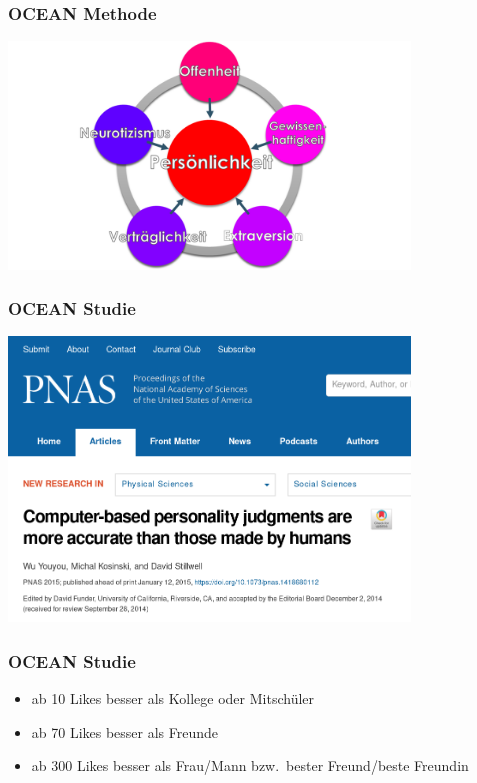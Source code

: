 \begin{frame}
	\frametitle{OCEAN Methode}
	\begin{center}
		\includegraphics[width=0.8\textwidth]{img/ocean-modell.png}
	\end{center}
\end{frame}

\begin{frame}
	\frametitle{OCEAN Studie}
	\begin{center}
		\includegraphics[width=0.8\textwidth]{img/ocean-facebook-studie.png}
	\end{center}
\end{frame}

\begin{frame}
	\frametitle{OCEAN Studie}
  \begin{itemize}
    \item<2-> ab 10 Likes besser als Kollege oder Mitschüler
    \item<3-> ab 70 Likes besser als Freunde
    \item<4-> ab 300 Likes besser als Frau/Mann bzw.\ bester Freund/beste Freundin
  \end{itemize}
\end{frame}
